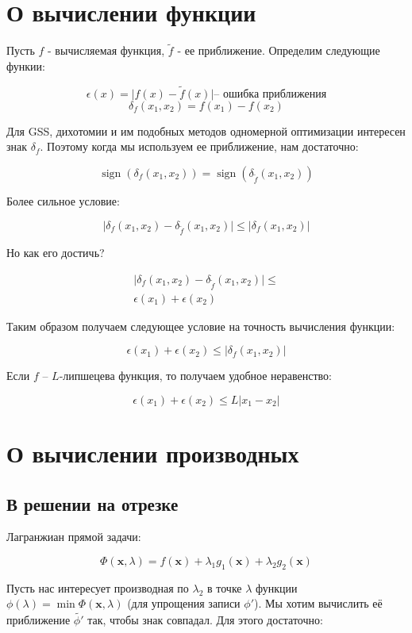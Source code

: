 \documentclass[12pt]{article}
\DeclareMathOperator{\sign}{sign}
\begin{document}
\section{О вычислении функции}
Пусть $f$ - вычисляемая функция, $\tilde f$ - ее приближение. Определим следующие функии:

$$\epsilon(x) = \Big|f(x)-\tilde{f}(x)\Big|\text{-- ошибка приближения}$$
$$\delta_f(x_1,x_2) = f(x_1)-f(x_2)$$

Для GSS, дихотомии и им подобных методов одномерной оптимизации интересен знак $\delta_f$. Поэтому когда мы используем ее приближение, нам достаточно:

$$\sign\left(\delta_f(x_1,x_2)\right) = \sign\left(\delta_{\tilde{f}}(x_1,x_2)\right)$$

Более сильное условие:

$$\Big|\delta_f(x_1,x_2) - \delta_{\tilde{f}}(x_1,x_2)\Big|\leq \Big|\delta_{f}(x_1,x_2)\Big|$$

Но как его достичь? 

\begin{gather}
\Big|\delta_f(x_1,x_2) - \delta_{\tilde{f}}(x_1,x_2)\Big| \leq\\
\epsilon(x_1)+\epsilon(x_2)
\end{gather}

Таким образом получаем следующее условие на точность вычисления функции:

$$\epsilon(x_1)+\epsilon(x_2)\leq \Big|\delta_{f}(x_1,x_2)\Big|$$

Если $f$ -- $L$-липшецева функция, то получаем удобное неравенство:

$$\boxed{\epsilon(x_1)+\epsilon(x_2)\leq L\Big|x_1-x_2\Big|}$$

\section{О вычислении производных}

\subsection{В решении на отрезке}

Лагранжиан прямой задачи:

$$\Phi(\textbf{x}, \lambda) = f(\textbf{x}) + \lambda_1g_1(\textbf{x})+\lambda_2g_2(\textbf{x})$$

Пусть нас интересует производная по $\lambda_2$ в точке $\lambda$ функции $\phi(\lambda) = \min \Phi(\textbf{x}, \lambda)$ (для упрощения записи $\phi'$). Мы хотим вычислить её приближение $\tilde{\phi'}$ так, чтобы знак совпадал. Для этого достаточно:
\end{document}
